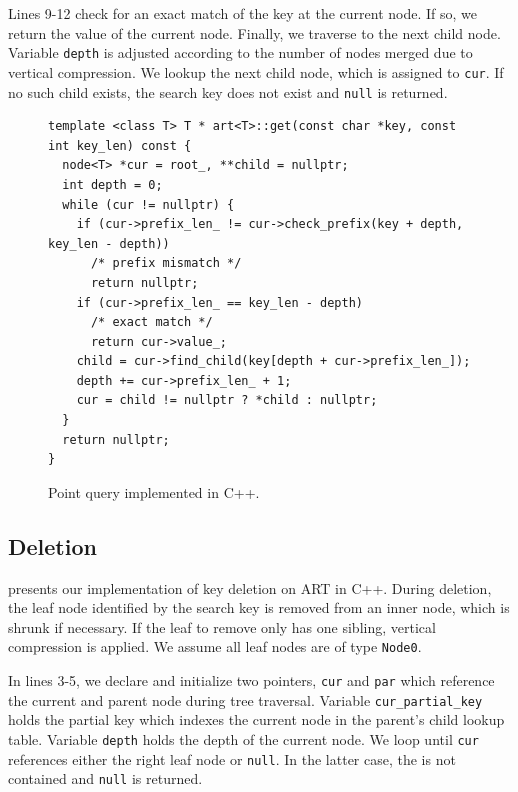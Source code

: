 \documentclass[abstracton,12pt]{scrartcl}
\theoremstyle{definition}
\begin{document}
Lines 9-12 check for an exact match of the key at the current node. If so,
we return the value of the current node. Finally, we traverse to the next child
node. Variable \texttt{depth} is adjusted according to the number of nodes 
merged due to vertical compression. We lookup the next child node, which is 
assigned to \texttt{cur}. If no such child exists, the search key does not 
exist and \texttt{null} is returned.

\vspace{-2mm}

\begin{figure}[H]
  \begin{verbatim}
template <class T> T * art<T>::get(const char *key, const int key_len) const {
  node<T> *cur = root_, **child = nullptr;
  int depth = 0;
  while (cur != nullptr) {
    if (cur->prefix_len_ != cur->check_prefix(key + depth, key_len - depth))
      /* prefix mismatch */
      return nullptr;
    if (cur->prefix_len_ == key_len - depth)
      /* exact match */
      return cur->value_;
    child = cur->find_child(key[depth + cur->prefix_len_]);
    depth += cur->prefix_len_ + 1;
    cur = child != nullptr ? *child : nullptr;
  }
  return nullptr;
}
  \end{verbatim}
  \vspace{-6mm}
  \caption{Point query implemented in C++.}
  \label{algo:point-query}
  \vspace{-7mm}
\end{figure}

\newpage

\subsection{Deletion}\label{sec:deletion}

 presents our implementation of key deletion on ART in C++.
During deletion, the leaf node identified by the search key is removed from an
inner node, which is shrunk if necessary. 
If the leaf to remove only has one sibling, vertical
compression is applied. We assume all leaf nodes are of type \texttt{Node0}.

In lines 3-5, we declare and initialize two pointers, \texttt{cur} and
\texttt{par} which reference the current and parent node during tree traversal.
Variable \texttt{cur\_partial\_key} holds the partial key which indexes the
current node in the parent's child lookup table.
Variable \texttt{depth} holds the depth of the current node.
We loop until \texttt{cur} references either the right leaf node or
\texttt{null}. In the latter case, the is not contained and \texttt{null} is 
returned.
\end{document}
